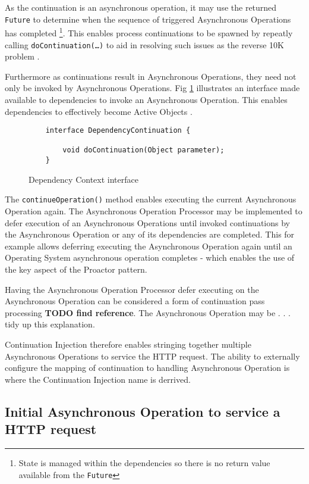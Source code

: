 \documentclass{article}
\begin{document}
As the continuation is an asynchronous operation, it may use the returned
\texttt{Future} to determine when the sequence of triggered Asynchronous
Operations has completed \footnote{State is managed within the dependencies so
there is no return value available from the \texttt{Future}}.  This enables
process continuations \cite{process-continuation} to be spawned by repeatly
calling \texttt{doContinuation(\ldots)} to aid in resolving such issues as the
reverse 10K problem \cite{reverse-ten-k-problem}.

Furthermore as continuations result in Asynchronous Operations, they need not
only be invoked by Asynchronous Operations. Fig \ref{fig:DC_interface}
illustrates an interface made available to dependencies to invoke an
Asynchronous Operation.  This enables dependencies to effectively become Active
Objects \cite{active-object}.

\begin{figure}[!t]
\begin{verbatim}
    interface DependencyContinuation {
            
        void doContinuation(Object parameter);
    }
\end{verbatim}
\caption[Caption for Code]{Dependency Context interface}
\label{fig:DC_interface}
\end{figure}


The \texttt{continueOperation()} method enables executing the current
Asynchronous Operation again.  The Asynchronous Operation Processor may be
implemented to defer execution of an Asynchronous Operations until invoked
continuations by the Asynchronous Operation or any of its dependencies are
completed.  This for example allows deferring executing the Asynchronous
Operation again until an Operating System asynchronous operation completes -
which enables the use of the key aspect of the Proactor pattern.

Having the Asynchronous Operation Processor defer executing on the Asynchronous
Operation can be considered a form of continuation pass processing \textbf{TODO
find reference}.  The Asynchronous Operation may be . . . tidy up this explanation.

Continuation Injection therefore enables stringing together multiple
Asynchronous Operations to service the HTTP request.  The ability to externally
configure the mapping of continuation to handling Asynchronous Operation is
where the Continuation Injection name is derrived.

\subsection{Initial Asynchronous Operation to service a HTTP request}
\end{document}
